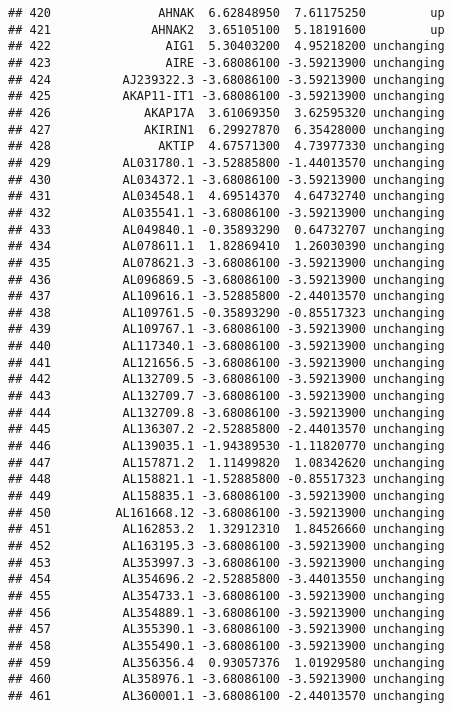 \documentclass[]{article}
\begin{document}
\begin{verbatim}
## 420               AHNAK  6.62848950  7.61175250         up
## 421              AHNAK2  3.65105100  5.18191600         up
## 422                AIG1  5.30403200  4.95218200 unchanging
## 423                AIRE -3.68086100 -3.59213900 unchanging
## 424          AJ239322.3 -3.68086100 -3.59213900 unchanging
## 425          AKAP11-IT1 -3.68086100 -3.59213900 unchanging
## 426             AKAP17A  3.61069350  3.62595320 unchanging
## 427             AKIRIN1  6.29927870  6.35428000 unchanging
## 428               AKTIP  4.67571300  4.73977330 unchanging
## 429          AL031780.1 -3.52885800 -1.44013570 unchanging
## 430          AL034372.1 -3.68086100 -3.59213900 unchanging
## 431          AL034548.1  4.69514370  4.64732740 unchanging
## 432          AL035541.1 -3.68086100 -3.59213900 unchanging
## 433          AL049840.1 -0.35893290  0.64732707 unchanging
## 434          AL078611.1  1.82869410  1.26030390 unchanging
## 435          AL078621.3 -3.68086100 -3.59213900 unchanging
## 436          AL096869.5 -3.68086100 -3.59213900 unchanging
## 437          AL109616.1 -3.52885800 -2.44013570 unchanging
## 438          AL109761.5 -0.35893290 -0.85517323 unchanging
## 439          AL109767.1 -3.68086100 -3.59213900 unchanging
## 440          AL117340.1 -3.68086100 -3.59213900 unchanging
## 441          AL121656.5 -3.68086100 -3.59213900 unchanging
## 442          AL132709.5 -3.68086100 -3.59213900 unchanging
## 443          AL132709.7 -3.68086100 -3.59213900 unchanging
## 444          AL132709.8 -3.68086100 -3.59213900 unchanging
## 445          AL136307.2 -2.52885800 -2.44013570 unchanging
## 446          AL139035.1 -1.94389530 -1.11820770 unchanging
## 447          AL157871.2  1.11499820  1.08342620 unchanging
## 448          AL158821.1 -1.52885800 -0.85517323 unchanging
## 449          AL158835.1 -3.68086100 -3.59213900 unchanging
## 450         AL161668.12 -3.68086100 -3.59213900 unchanging
## 451          AL162853.2  1.32912310  1.84526660 unchanging
## 452          AL163195.3 -3.68086100 -3.59213900 unchanging
## 453          AL353997.3 -3.68086100 -3.59213900 unchanging
## 454          AL354696.2 -2.52885800 -3.44013550 unchanging
## 455          AL354733.1 -3.68086100 -3.59213900 unchanging
## 456          AL354889.1 -3.68086100 -3.59213900 unchanging
## 457          AL355390.1 -3.68086100 -3.59213900 unchanging
## 458          AL355490.1 -3.68086100 -3.59213900 unchanging
## 459          AL356356.4  0.93057376  1.01929580 unchanging
## 460          AL358976.1 -3.68086100 -3.59213900 unchanging
## 461          AL360001.1 -3.68086100 -2.44013570 unchanging

\end{verbatim}
\end{document}
